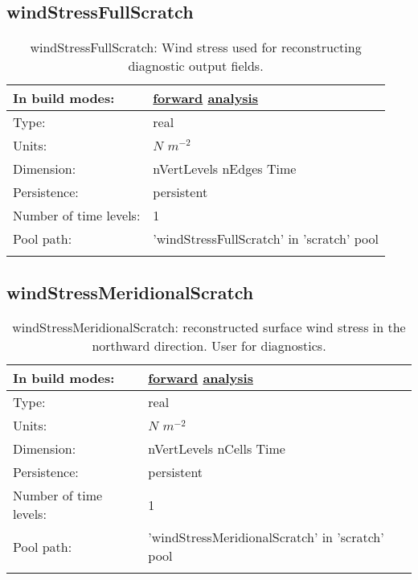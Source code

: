 \subsection[windStressFullScratch]{windStressFullScratch}
\label{subsec:var_sec_scratch_windStressFullScratch}
\begin{center}
\begin{longtable}{| p{2.0in} | p{4.0in} |}
        \hline 
        In build modes: & \hyperref[subsec:forward_var_tab_scratch]{forward} \hyperref[subsec:analysis_var_tab_scratch]{analysis} \\
        \hline 
        Type: & real \\
        \hline 
        Units: & $N$ $m^{-2}$ \\
        \hline 
        Dimension: & nVertLevels nEdges Time \\
        \hline 
        Persistence: & persistent \\
        \hline 
        Number of time levels: & 1 \\
        \hline 
            Pool path: & 'windStressFullScratch' in 'scratch' pool
 \\
		 \hline 
    \caption{windStressFullScratch: Wind stress used for reconstructing diagnostic output fields.}
\end{longtable}
\end{center}
\subsection[windStressMeridionalScratch]{windStressMeridionalScratch}
\label{subsec:var_sec_scratch_windStressMeridionalScratch}
\begin{center}
\begin{longtable}{| p{2.0in} | p{4.0in} |}
        \hline 
        In build modes: & \hyperref[subsec:forward_var_tab_scratch]{forward} \hyperref[subsec:analysis_var_tab_scratch]{analysis} \\
        \hline 
        Type: & real \\
        \hline 
        Units: & $N$ $m^{-2}$ \\
        \hline 
        Dimension: & nVertLevels nCells Time \\
        \hline 
        Persistence: & persistent \\
        \hline 
        Number of time levels: & 1 \\
        \hline 
            Pool path: & 'windStressMeridionalScratch' in 'scratch' pool
 \\
		 \hline 
    \caption{windStressMeridionalScratch: reconstructed surface wind stress in the northward direction. User for diagnostics.}
\end{longtable}
\end{center}
